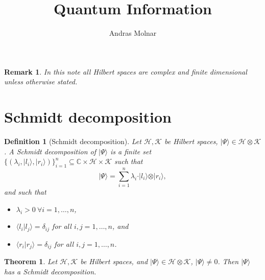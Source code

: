 \documentclass{article}
\title{Quantum Information}
\author{Andras Molnar}
\newtheorem{theorem}{Theorem}
\newtheorem{remark}{Remark}
\newtheorem{definition}{Definition}
\theoremstyle{definition}
\newcommand{\ket}[1]{\vert #1 \rangle}
\newcommand{\scalprod}[2]{\langle #1 \vert #2 \rangle}
\begin{document}
\maketitle

\begin{remark}
  In this note all Hilbert spaces are complex and finite dimensional unless otherwise stated.
\end{remark}

\section{Schmidt decomposition}

\begin{definition}[Schmidt decomposition]
  Let $\mathcal{H},\mathcal{K}$ be Hilbert spaces, $\ket{\Psi}\in\mathcal{H}\otimes \mathcal{K}$. A Schmidt decomposition of $\ket{\Psi}$ is a finite set $\{(\lambda_i, \ket{l_i}, \ket{r_i})\}_{i=1}^n\subseteq \mathbb{C}\times \mathcal{H}\times \mathcal{K}$ such that
  \begin{equation*}
    \ket{\Psi} = \sum_{i=1}^n \lambda_i \cdot \ket{l_i} \otimes \ket{r_i},
  \end{equation*}
  and such that
  \begin{itemize}
  \item  $\lambda_i> 0\ \forall i = 1,\dots, n$,
  \item $\scalprod{l_i}{l_j} = \delta_{ij}$ for all $i,j=1,\dots, n$, and
  \item $\scalprod{r_i}{r_j} = \delta_{ij}$ for all $i,j=1,\dots, n$.
  \end{itemize}
\end{definition}

\begin{theorem}
  Let $\mathcal{H},\mathcal{K}$ be Hilbert spaces, and $\ket{\Psi}\in\mathcal{H}\otimes \mathcal{K}$, $\ket{\Psi}\neq 0$. Then $\ket{\Psi}$ has a Schmidt decomposition.
\end{theorem}
\end{document}
